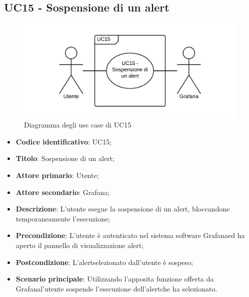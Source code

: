 \subsection{UC15 - Sospensione di un alert}
\begin{figure}[H]
\includegraphics{img/UC15_-_Sospensione_di_un_alert.png}
\caption{Diagramma degli use case di UC15}
\end{figure}
\begin{itemize}
	\item \textbf{Codice identificativo}: UC15;
	\item \textbf{Titolo}: Sospensione di un alert\glo;
	\item \textbf{Attore primario}: Utente;
	\item \textbf{Attore secondario}: Grafana\glo;
	\item \textbf{Descrizione}: L'utente esegue la sospensione di un alert\glosp, bloccandone temporaneamente l'esecuzione;
	\item \textbf{Precondizione}: L'utente è autenticato nel sistema software Grafana\glosp ed ha aperto il pannello di visualizzazione alert\glo;
	\item \textbf{Postcondizione}: L'alert\glosp selezionato dall'utente è sospeso;
	\item \textbf{Scenario principale}: Utilizzando l'apposita funzione offerta da Grafana\glosp l'utente sospende l'esecuzione dell'alert\glosp che ha selezionato.
\end{itemize} 

